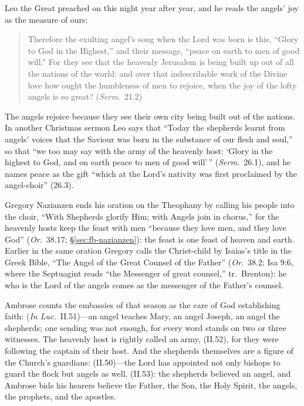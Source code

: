 Leo the Great preached on this night year after year, and he reads the
angels' joy as the measure of ours:

\begin{quote}
Therefore the exulting angel's song when the Lord was born is this, ``Glory
to God in the Highest,'' and their message, ``peace on earth to men of good
will.'' For they see that the heavenly Jerusalem is being built up out of
all the nations of the world: and over that indescribable work of the
Divine love how ought the humbleness of men to rejoice, when the joy of the
lofty angels is so great? (\emph{Serm.}\ 21.2)
\end{quote}

\noindent The angels rejoice because they see their own city being built out
of the nations. In another Christmas sermon Leo says that ``Today the
shepherds learnt from angels' voices that the Saviour was born in the
substance of our flesh and soul,'' so that ``we too may say with the army of
the heavenly host: `Glory in the highest to God, and on earth peace to men
of good will'\,'' (\emph{Serm.}\ 26.1), and he names peace as the gift
``which at the Lord's nativity was first proclaimed by the angel-choir''
(26.3).

Gregory Nazianzen ends his oration on the Theophany by calling his people
into the choir, ``With Shepherds glorify Him; with Angels join in chorus,''
for the heavenly hosts keep the feast with men ``because they love men, and
they love God'' (\emph{Or.}\ 38.17; \S\ref{sec:fb-nazianzen}): the feast is
one feast of heaven and earth. Earlier in the same oration Gregory
calls the Christ-child by Isaias's title in the Greek Bible, ``The Angel of
the Great Counsel of the Father'' (\emph{Or.}\ 38.2; Isa 9:6, where the
Septuagint reads ``the Messenger of great counsel,'' tr.\ Brenton): he who is the Lord of
the angels comes as the messenger of the Father's counsel.

Ambrose counts the embassies of that season as the care of God
establishing faith:  (\emph{In Luc.}\ II.51)---an angel teaches Mary, an angel
Joseph, an angel the shepherds; one sending was not enough, for every word
stands on two or three witnesses. The heavenly host is rightly called an
army,  (II.52), for they were
following the captain of their host. And the shepherds themselves are a
figure of the Church's guardians:  (II.50)---the Lord
has appointed not only bishops to guard the flock but angels as well.
 (II.53): the shepherds believed an
angel, and Ambrose bids his hearers believe the Father, the Son, the Holy
Spirit, the angels, the prophets, and the apostles.

